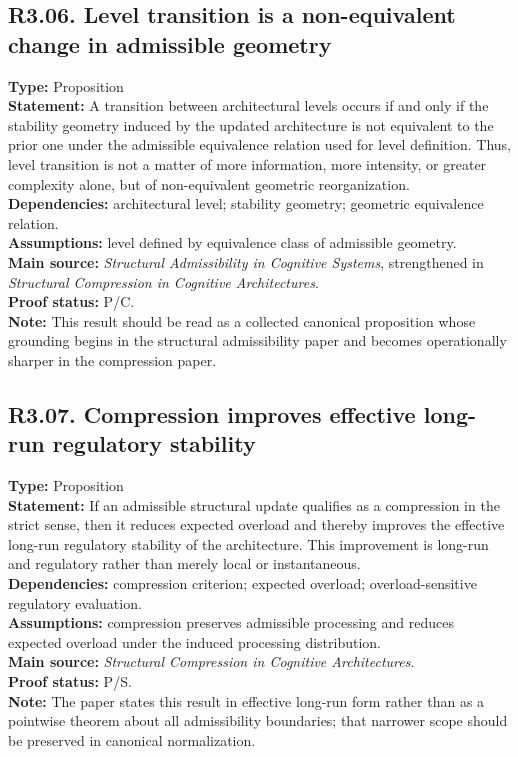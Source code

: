 \documentclass[12pt]{article}
\begin{document}
	\subsection*{R3.06. Level transition is a non-equivalent change in admissible geometry}
	\textbf{Type:} Proposition \\
	\textbf{Statement:} A transition between architectural levels occurs if and only if the
	stability geometry induced by the updated architecture is not equivalent to the prior one under
	the admissible equivalence relation used for level definition. Thus, level transition is not a
	matter of more information, more intensity, or greater complexity alone, but of non-equivalent
	geometric reorganization. \\
	\textbf{Dependencies:} architectural level; stability geometry; geometric equivalence relation. \\
	\textbf{Assumptions:} level defined by equivalence class of admissible geometry. \\
	\textbf{Main source:} \emph{Structural Admissibility in Cognitive Systems}, strengthened in
	\emph{Structural Compression in Cognitive Architectures}. \\
	\textbf{Proof status:} P/C. \\
	\textbf{Note:} This result should be read as a collected canonical proposition whose grounding
	begins in the structural admissibility paper and becomes operationally sharper in the
	compression paper.
	
	\subsection*{R3.07. Compression improves effective long-run regulatory stability}
	\textbf{Type:} Proposition \\
	\textbf{Statement:} If an admissible structural update qualifies as a compression in the strict
	sense, then it reduces expected overload and thereby improves the effective long-run regulatory
	stability of the architecture. This improvement is long-run and regulatory rather than merely
	local or instantaneous. \\
	\textbf{Dependencies:} compression criterion; expected overload; overload-sensitive regulatory
	evaluation. \\
	\textbf{Assumptions:} compression preserves admissible processing and reduces expected overload
	under the induced processing distribution. \\
	\textbf{Main source:} \emph{Structural Compression in Cognitive Architectures}. \\
	\textbf{Proof status:} P/S. \\
	\textbf{Note:} The paper states this result in effective long-run form rather than as a
	pointwise theorem about all admissibility boundaries; that narrower scope should be preserved in
	canonical normalization.
	
\end{document}
